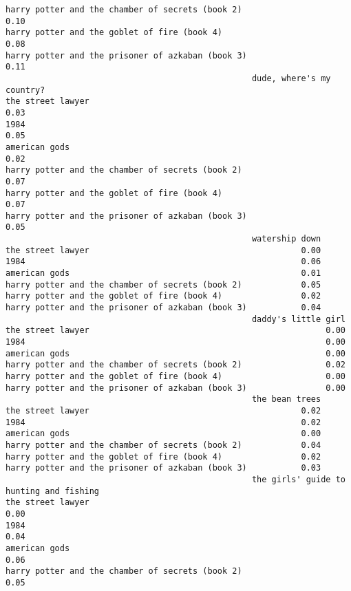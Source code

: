 \documentclass[
]{report}
\begin{document}
\begin{verbatim}
harry potter and the chamber of secrets (book 2)                        0.10
harry potter and the goblet of fire (book 4)                            0.08
harry potter and the prisoner of azkaban (book 3)                       0.11
                                                  dude, where's my country?
the street lawyer                                                      0.03
1984                                                                   0.05
american gods                                                          0.02
harry potter and the chamber of secrets (book 2)                       0.07
harry potter and the goblet of fire (book 4)                           0.07
harry potter and the prisoner of azkaban (book 3)                      0.05
                                                  watership down
the street lawyer                                           0.00
1984                                                        0.06
american gods                                               0.01
harry potter and the chamber of secrets (book 2)            0.05
harry potter and the goblet of fire (book 4)                0.02
harry potter and the prisoner of azkaban (book 3)           0.04
                                                  daddy's little girl
the street lawyer                                                0.00
1984                                                             0.00
american gods                                                    0.00
harry potter and the chamber of secrets (book 2)                 0.02
harry potter and the goblet of fire (book 4)                     0.00
harry potter and the prisoner of azkaban (book 3)                0.00
                                                  the bean trees
the street lawyer                                           0.02
1984                                                        0.02
american gods                                               0.00
harry potter and the chamber of secrets (book 2)            0.04
harry potter and the goblet of fire (book 4)                0.02
harry potter and the prisoner of azkaban (book 3)           0.03
                                                  the girls' guide to hunting and fishing
the street lawyer                                                                    0.00
1984                                                                                 0.04
american gods                                                                        0.06
harry potter and the chamber of secrets (book 2)                                     0.05

\end{verbatim}
\end{document}
